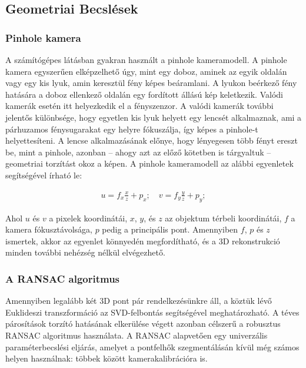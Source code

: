 \documentclass[12pt,a4paper,oneside]{report}             %
\begin{document}
\subsection{Geometriai Becslések}

\subsubsection{Pinhole kamera}

A számítógépes látásban gyakran használt a pinhole kameramodell. A pinhole kamera egyszerűen elképzelhető úgy, mint egy doboz, aminek az egyik oldalán vagy egy kis lyuk, amin keresztül fény képes beáramlani. A lyukon beérkező fény hatására a doboz ellenkező oldalán egy fordított állású kép keletkezik. Valódi kamerák esetén itt helyezkedik el a fényszenzor. A valódi kamerák további jelentős különbsége, hogy egyetlen kis lyuk helyett egy lencsét alkalmaznak, ami a párhuzamos fénysugarakat egy helyre fókuszálja, így képes a pinhole-t helyettesíteni. A lencse alkalmazásának előnye, hogy lényegesen több fényt ereszt be, mint a pinhole, azonban – ahogy azt az előző kötetben is tárgyaltuk – geometriai torzítást okoz a képen. A pinhole kameramodell az alábbi egyenletek segítségével írható le: 

\begin{equation}
\begin{gathered} 
u = f_x \frac{x}{z} + p_x; \quad v = f_y \frac{y}{z} + p_y; 
\end{gathered}
\end{equation}

Ahol \( u \) és \( v \) a pixelek koordinátái, \( x \), \( y \), és \( z \) az objektum térbeli koordinátái, \( f \) a kamera fókusztávolsága, \( p \) pedig a principális pont. Amennyiben \( f \), \( p \) és \( z \) ismertek, akkor az egyenlet könnyedén megfordítható, és a 3D rekonstrukció minden további nehézség nélkül elvégezhető.

\subsubsection{A RANSAC algoritmus}

Amennyiben legalább két 3D pont pár rendelkezésünkre áll, a köztük lévő Euklideszi transzformáció az SVD-felbontás segítségével meghatározható. A téves párosítások torzító hatásának elkerülése végett azonban célszerű a robusztus RANSAC algoritmus használata. A RANSAC alapvetően egy univerzális paraméterbecslési eljárás, amelyet a pontfelhők szegmentálásán kívül még számos helyen használnak: többek között kamerakalibrációra is.
\end{document}
